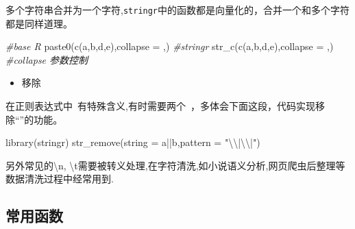 \documentclass[
]{book}
\newenvironment{Shaded}{\begin{snugshade}}{\end{snugshade}}
\newcommand{\AttributeTok}[1]{\textcolor[rgb]{0.77,0.63,0.00}{#1}}
\newcommand{\CommentTok}[1]{\textcolor[rgb]{0.56,0.35,0.01}{\textit{#1}}}
\newcommand{\FunctionTok}[1]{\textcolor[rgb]{0.00,0.00,0.00}{#1}}
\newcommand{\NormalTok}[1]{#1}
\newcommand{\SpecialCharTok}[1]{\textcolor[rgb]{0.00,0.00,0.00}{#1}}
\newcommand{\StringTok}[1]{\textcolor[rgb]{0.31,0.60,0.02}{#1}}
\providecommand{\tightlist}{%
  \setlength{\itemsep}{0pt}\setlength{\parskip}{0pt}}
\begin{document}
多个字符串合并为一个字符,\texttt{stringr}中的函数都是向量化的，合并一个和多个字符都是同样道理。

\begin{Shaded}
\begin{Highlighting}[]
\CommentTok{\#base R}
\FunctionTok{paste0}\NormalTok{(}\FunctionTok{c}\NormalTok{(}\StringTok{\textquotesingle{}a\textquotesingle{}}\NormalTok{,}\StringTok{\textquotesingle{}b\textquotesingle{}}\NormalTok{,}\StringTok{\textquotesingle{}d\textquotesingle{}}\NormalTok{,}\StringTok{\textquotesingle{}e\textquotesingle{}}\NormalTok{),}\AttributeTok{collapse =} \StringTok{\textquotesingle{},\textquotesingle{}}\NormalTok{)}
\CommentTok{\#stringr}
\FunctionTok{str\_c}\NormalTok{(}\FunctionTok{c}\NormalTok{(}\StringTok{\textquotesingle{}a\textquotesingle{}}\NormalTok{,}\StringTok{\textquotesingle{}b\textquotesingle{}}\NormalTok{,}\StringTok{\textquotesingle{}d\textquotesingle{}}\NormalTok{,}\StringTok{\textquotesingle{}e\textquotesingle{}}\NormalTok{),}\AttributeTok{collapse =} \StringTok{\textquotesingle{},\textquotesingle{}}\NormalTok{)  }\CommentTok{\#collapse 参数控制}
\end{Highlighting}
\end{Shaded}

\begin{itemize}
\tightlist
\item
  移除
\end{itemize}

在正则表达式中~有特殊含义,有时需要两个~，多体会下面这段，代码实现移除``\textbar\textbar{}''的功能。

\begin{Shaded}
\begin{Highlighting}[]
\FunctionTok{library}\NormalTok{(stringr)}
\FunctionTok{str\_remove}\NormalTok{(}\AttributeTok{string =} \StringTok{\textquotesingle{}a||b\textquotesingle{}}\NormalTok{,}\AttributeTok{pattern =} \StringTok{"}\SpecialCharTok{\textbackslash{}\textbackslash{}}\StringTok{|}\SpecialCharTok{\textbackslash{}\textbackslash{}}\StringTok{|"}\NormalTok{)}
\end{Highlighting}
\end{Shaded}

另外常见的\textbackslash n, \textbackslash t需要被转义处理,在字符清洗,如小说语义分析,网页爬虫后整理等数据清洗过程中经常用到.

\hypertarget{stringr-functions}{%
\subsection{常用函数}\label{stringr-functions}}
\end{document}
